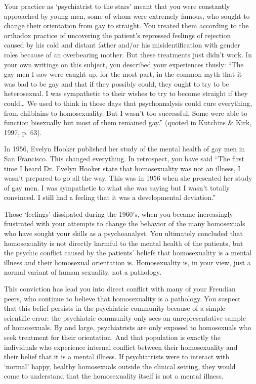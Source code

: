 \begin{refsection}
Your practice as `psychiatrist to the stars' meant that you were constantly approached by young men, some of whom were extremely famous, who sought to change their orientation from gay to straight. You treated them according to the orthodox practice of uncovering the patient's repressed feelings of rejection caused by his cold and distant father and\slash or his misidentification with gender roles because of an overbearing mother. But these treatments just didn't work. In your own writings on this subject, you described your experiences thusly: ``The gay men I saw were caught up, for the most part, in the common myth that it was bad to be gay and that if they possibly could, they ought to try to be heterosexual. I was sympathetic to their wishes to try to become straight if they could{\ldots} We used to think in those days that psychoanalysis could cure everything, from chilblains to homosexuality. But I wasn't too successful. Some were able to function bisexually but most of them remained gay.'' (quoted in Kutchins \& Kirk, 1997, p. 63).

In 1956, Evelyn Hooker published her study of the mental health of gay men in San Francisco. This changed everything. In retrospect, you have said ``The first time I heard Dr. Evelyn Hooker state that homosexuality was not an illness, I wasn't prepared to go all the way. This was in 1956 when she presented her study of gay men. I was sympathetic to what she was saying but I wasn't totally convinced. I still had a feeling that it was a developmental deviation.''

Those `feelings' dissipated during the 1960's, when you became increasingly frustrated with your attempts to change the behavior of the many homosexuals who have sought your skills as a psychoanalyst. You ultimately concluded that homosexuality is not directly harmful to the mental health of the patients, but the psychic conflict caused by the patients' beliefs that homosexuality is a mental illness and their homosexual orientation is. Homosexuality is, in your view, just a normal variant of human sexuality, not a pathology.

This conviction has lead you into direct conflict with many of your Freudian peers, who continue to believe that homosexuality is a pathology. You suspect that this belief persists in the psychiatric community because of a simple scientific error: the psychiatric community only sees an unrepresentative sample of homosexuals. By and large, psychiatrists are only exposed to homosexuals who seek treatment for their orientation. And that population is exactly the individuals who experience internal conflict between their homosexuality and their belief that it is a mental illness. If psychiatrists were to interact with `normal' happy, healthy homosexuals outside the clinical setting, they would come to understand that the homosexuality itself is not a mental illness.


\end{refsection}
